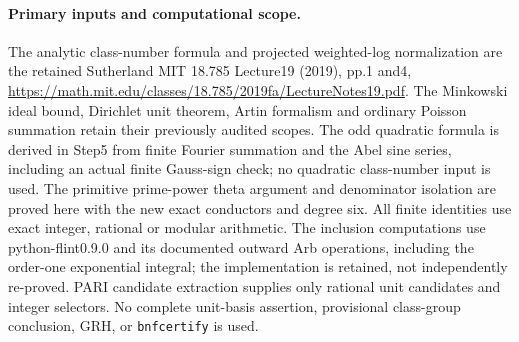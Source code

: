 \paragraph{Primary inputs and computational scope.}
The analytic class-number formula and projected weighted-log
normalization are the retained Sutherland MIT 18.785 Lecture19
(2019), pp.1 and4,
\url{https://math.mit.edu/classes/18.785/2019fa/LectureNotes19.pdf}.
The Minkowski ideal bound, Dirichlet unit theorem, Artin formalism
and ordinary Poisson summation retain their previously audited scopes.
The odd quadratic formula is derived in Step5 from finite Fourier
summation and the Abel sine series, including an actual finite
Gauss-sign check; no quadratic class-number input is used.
The primitive prime-power theta argument and denominator isolation
are proved here with the new exact conductors and degree six.
All finite identities use exact integer, rational or modular arithmetic.
The inclusion computations use python-flint0.9.0 and its documented
outward Arb operations, including the order-one exponential integral;
the implementation is retained, not independently re-proved.
PARI candidate extraction supplies only rational unit candidates
and integer selectors.  No complete unit-basis assertion, provisional
class-group conclusion, GRH, or \texttt{bnfcertify} is used.
